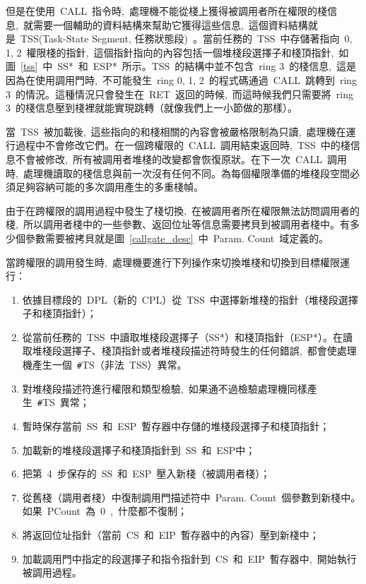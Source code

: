 
但是在使用~CALL~指令時,~處理機不能從棧上獲得被調用者所在權限的棧信息,~就需要一個輔助的資料結構來幫助它獲得這些信息,~這個資料結構就是~TSS(Task-State Segment, 任務狀態段)~。當前任務的~TSS~中存儲著指向~0, 1, 2~權限棧的指針,~這個指針指向的內容包括一個堆棧段選擇子和棧頂指針,~如圖~\ref{tss}~中~SS*~和~ESP*~所示。TSS~的結構中並不包含~ring 3~的棧信息,~這是因為在使用調用門時,~不可能發生~ring 0, 1, 2~的程式碼通過~CALL~跳轉到~ring 3~的情況。這種情況只會發生在~RET~返回的時候,~而這時候我們只需要將~ring 3~的棧信息壓到棧裡就能實現跳轉（就像我們上一小節做的那樣）。

當~TSS~被加載後,~這些指向的和棧相關的內容會被嚴格限制為只讀,~處理機在運行過程中不會修改它們。在一個跨權限的~CALL~調用結束返回時,~TSS~中的棧信息不會被修改,~所有被調用者堆棧的改變都會恢復原狀。在下一次~CALL~調用時,~處理機讀取的棧信息與前一次沒有任何不同。為每個權限準備的堆棧段空間必須足夠容納可能的多次調用產生的多重棧幀。

由于在跨權限的調用過程中發生了棧切換,~在被調用者所在權限無法訪問調用者的棧,~所以調用者棧中的一些參數、返回位址等信息需要拷貝到被調用者棧中。有多少個參數需要被拷貝就是圖~\ref{callgate_desc}~中~Param. Count~域定義的。

當跨權限的調用發生時,~處理機要進行下列操作來切換堆棧和切換到目標權限運行：

\begin{enumerate}
\item 依據目標段的~DPL（新的~CPL）從~TSS~中選擇新堆棧的指針（堆棧段選擇子和棧頂指針）；
\item 從當前任務的~TSS~中讀取堆棧段選擇子（SS*）和棧頂指針（ESP*）。在讀取堆棧段選擇子、棧頂指針或者堆棧段描述符時發生的任何錯誤,~都會使處理機產生一個~\texttt{\#}TS（非法~TSS）異常。
\item 對堆棧段描述符進行權限和類型檢驗,~如果通不過檢驗處理機同樣產生~\texttt{\#}TS~異常；
\item 暫時保存當前~SS~和~ESP~暫存器中存儲的堆棧段選擇子和棧頂指針；
\item 加載新的堆棧段選擇子和棧頂指針到~SS~和~ESP中；
\item 把第~4~步保存的~SS~和~ESP~壓入新棧（被調用者棧）；
\item 從舊棧（調用者棧）中復制調用門描述符中~Param. Count~個參數到新棧中。如果~PCount~為~0~,~什麼都不復制；
\item 將返回位址指針（當前~CS~和~EIP~暫存器中的內容）壓到新棧中；
\item 加載調用門中指定的段選擇子和指令指針到~CS~和~EIP~暫存器中,~開始執行被調用過程。
\end{enumerate}

